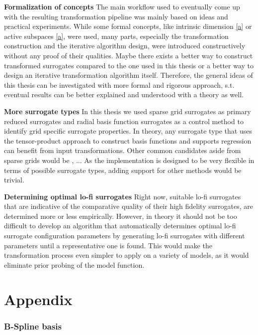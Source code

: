 \documentclass[
  a4paper,  %
  twoside,  %
  bibliography=totoc,
  headsepline,
  cleardoublepage=empty,
  parskip=half,
  draft=false
]{scrbook}
\begin{document}
\vspace{1em}
\textbf{Formalization of concepts}
The main workflow used to eventually come up with the resulting transformation pipeline was mainly based on ideas and practical experiments.
While some formal concepts, like intrinsic dimension \cref{a} or active subspaces \cref{a}, were used, many parts, especially the transformation construction and the iterative algorithm design, were introduced constructively without any proof of their qualities.
Maybe there exists a better way to construct transformed surrogates compared to the one used in this thesis or a better way to design an iterative transformation algorithm itself.
Therefore, the general ideas of this thesis can be investigated with more formal and rigorous approach, s.t. eventual results can be better explained and understood with a theory as well.

\vspace{1em}
\textbf{More surrogate types}
In this thesis we used sparse grid surrogates as primary reduced surrogates and radial basis function surrogates as a control method to identify grid specific surrogate properties.
In theory, any surrogate type that uses the tensor-product approach to construct basis functions and supports regression can benefit from input transformations.
Other common candidates aside from sparse grids would be , ...
As the implementation is designed to be very flexible in terms of possible surrogate types, adding support for other methods would be trivial.

\vspace{1em}
\textbf{Determining optimal lo-fi surrogates}
Right now, suitable lo-fi surrogates that are indicative of the comparative quality of their high fidelity surrogates, are determined more or less empirically.
However, in theory it should not be too difficult to develop an algorithm that automatically determines optimal lo-fi surrogate configuration parameters by generating lo-fi surrogates with different parameters until a representative one is found.
This would make the transformation process even simpler to apply on a variety of models, as it would eliminate prior probing of the model function.

\appendix
\chapter{Appendix}

\subsection{B-Spline basis}
\end{document}
